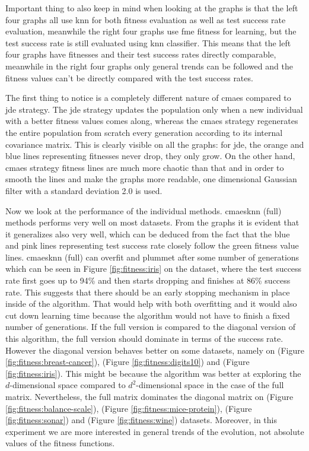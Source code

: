 \documentclass[12pt,a4paper]{report}
\begin{document}
Important thing to also keep in mind when looking at the graphs is that the left four graphs all use \ac{knn} for both fitness evaluation as well as test success rate evaluation, meanwhile the right four graphs use \ac{fme} fitness for learning, but the test success rate is still evaluated using \ac{knn} classifier. This means that the left four graphs have fitnesses and their test success rates directly comparable, meanwhile in the right four graphs only general trends can be followed and the fitness values can't be directly compared with the test success rates.

The first thing to notice is a completely different nature of \ac{cmaes} compared to \ac{jde} strategy. The \ac{jde} strategy updates the population only when a new individual with a better fitness values comes along, whereas the \ac{cmaes} strategy regenerates the entire population from scratch every generation according to its internal covariance matrix. This is clearly visible on all the graphs: for \ac{jde}, the orange and blue lines representing fitnesses never drop, they only grow. On the other hand, \ac{cmaes} strategy fitness lines are much more chaotic than that and in order to smooth the lines and make the graphs more readable, one dimensional Gaussian filter with a standard deviation 2.0 is used.

Now we look at the performance of the individual methods. \ac{cmaesknn} (full) methods performs very well on most datasets. From the graphs it is evident that it generalizes also very well, which can be deduced from the fact that the blue and pink lines representing test success rate closely follow the green fitness value lines. \ac{cmaesknn} (full) can overfit and plummet after some number of generations which can be seen in Figure \ref{fig:fitness:iris} on the  dataset, where the test success rate first goes up to 94\% and then starts dropping and finishes at 86\% success rate. This suggests that there should be an early stopping mechanism in place inside of the algorithm. That would help with both overfitting and it would also cut down learning time because the algorithm would not have to finish a fixed number of generations. If the full version is compared to the diagonal version of this algorithm, the full version should dominate in terms of the success rate. However the diagonal version behaves  better on some datasets, namely on  (Figure \ref{fig:fitness:breast-cancer}),  (Figure \ref{fig:fitness:digits10}) and  (Figure \ref{fig:fitness:iris}). This might be because the algorithm was better at exploring the $d$-dimensional space compared to $d^2$-dimensional space in the case of the full matrix. Nevertheless, the full matrix dominates the diagonal matrix on  (Figure \ref{fig:fitness:balance-scale}),  (Figure \ref{fig:fitness:mice-protein}),  (Figure \ref{fig:fitness:sonar}) and  (Figure \ref{fig:fitness:wine}) datasets. Moreover, in this experiment we are more interested in general trends of the evolution, not absolute values of the fitness functions.
\end{document}
